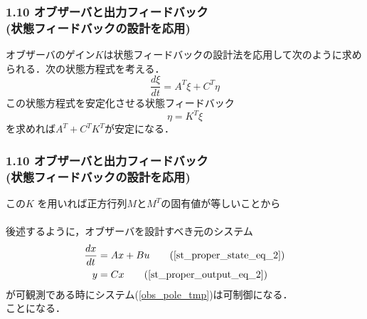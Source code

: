 \begin{frame}[t]
\frametitle{1.10 オブザーバと出力フィードバック \\
(状態フィードバックの設計を応用)}
オブザーバのゲイン$K$は状態フィードバックの設計法を応用して次のように求められる．次の状態方程式を考える．
\begin{equation}
 \frac{d \xi}{dt} = A^T \xi + C^T \eta
\label{obs_pole_tmp}
\end{equation}
この状態方程式を安定化させる状態フィードバック
\begin{equation}
 \eta =  K^T \xi
\end{equation}
を求めれば$A^T + C^T K^T$が安定になる．\\
\end{frame}


\begin{frame}[t]
\frametitle{1.10 オブザーバと出力フィードバック \\
(状態フィードバックの設計を応用)}
この$K$ を用いれば正方行列$M$と$M^T$の固有値が等しいことから
\\[5mm]
\hspace*{1cm}\\[5mm]
後述するように，オブザーバを設計すべき元のシステム
\begin{align}
 \frac{dx}{dt} &= A x + B u \tag{\ref{st_proper_state_eq_2}} \\
 y             &= C x \tag{\ref{st_proper_output_eq_2}}
\end{align}
が可観測である時にシステム(\ref{obs_pole_tmp})は可制御になる．\\
ことになる．
\end{frame}


